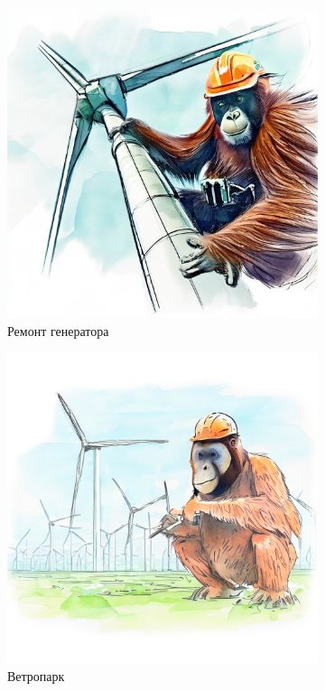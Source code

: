 \documentclass[a5paper,11pt]{memoir}
\begin{document}
\vspace{-0.5cm}
\begin{figure}%
  \begin{subfigure}{.33\paperwidth}
    \centering
    \includegraphics[width=.8\linewidth]{images/orangutan-climber.jpg}
    \caption{Ремонт генератора}
  \end{subfigure}%
  \begin{subfigure}{.33\paperwidth}
    \centering
    \includegraphics[width=.8\linewidth]{images/orangutan-windfarm.jpg}
    \caption{Ветропарк}
  \end{subfigure}%
  \begin{subfigure}{.33\paperwidth}

\end{subfigure}
\end{figure}
\end{document}
